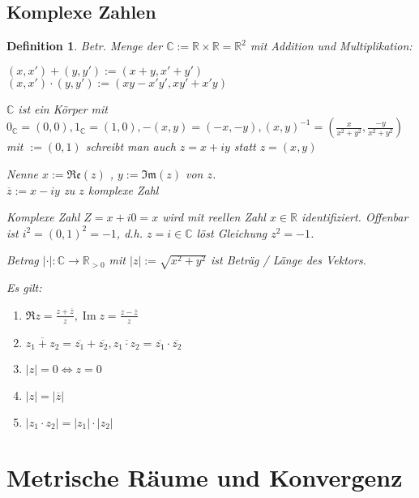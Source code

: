 \documentclass[ngerman,a4paper]{report}
\theoremstyle{break}
\newtheorem*{definition}{Definition}
\newcommand{\highlight}[1]{\emph{#1}}
\newcommand{\realz}{\mathfrak{Re}}
\newcommand{\imagz}{\mathfrak{Im}}
\DeclareMathOperator{\im}{Im}
\begin{document}
\section{Komplexe Zahlen}
\begin{definition}
	Betr. Menge der  $\mathbb{C}:=\mathbb{R}\times\mathbb{R} = \mathbb{R}^2$ mit Addition und Multiplikation:
	
	$(x,x') + (y,y') := (x+y, x'+y')$\\
	$(x,x')\cdot(y,y') :=(xy - x'y', xy' + x'y)$
	
	$\mathbb{C}$ ist ein Körper mit $0_\mathbb{C} = (0,0), 1_\mathbb{C} = (1,0), -(x,y)= (-x,-y), (x,y)^{-1} = \left(\frac{x}{x^2 + y^2}, \frac{-y}{x^2 + y^2}\right)$ mit $:=(0,1)$ schreibt man auch $z=x+iy$ statt $z = (x,y)$
	
	Nenne $x:=\realz(z)$ , $y:=\imagz(z)$  von $z$.\\
	$\overline{z}:= x - iy$ zu $z$ \highlight{komplexe Zahl}
	
	Komplexe Zahl $Z = x+i0 = x$ wird mit reellen Zahl $x\in\mathbb{R}$ identifiziert. Offenbar ist $i^2 = (0,1)^2 = -1$, d.h. $z = i\in\mathbb{C}$ löst Gleichung $z^2 = -1$.
	
	Betrag $\vert\cdot\vert:\mathbb{C}\rightarrow \mathbb{R}_{>0}$ mit $\vert z\vert :=\sqrt{x^2 + y^2}$ ist Beträg / Länge des Vektors.
	
	Es gilt:
	\begin{enumerate}[label={\alph*)}]
		\item $\Re z = \frac{z+\overline{z}}{z}, \im z = \frac{z - \overline{z}}{z}$
		\item $\overline{z_1 + z_2} = \overline{z_1} + \overline{z_2}, \overline{z_1 \cdot z_2} = \overline{z_1}\cdot \overline{z_2}$
		\item $|z| = 0 \Leftrightarrow z = 0$
		\item $|z | = |\overline{z}|$
		\item $|z_1 \cdot z_2 | = |z_1| \cdot |z_2|$
	\end{enumerate}
\end{definition}

\chapter{Metrische Räume und Konvergenz}\addtocounter{section}{6}
\end{document}
